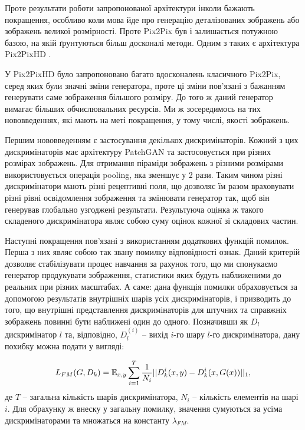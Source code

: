Проте результати роботи запропонованої архітектури інколи
бажають покращення, особливо коли мова йде про генерацію
деталізованих зображень або зображень великої розмірності.
Проте Pix2Pix був і залишається потужною базою, на якій
ґрунтуються більш досконалі методи. Одним з таких є архітектура
Pix2PixHD \cite{pix2pixHD}.

У Pix2PixHD було запропоновано багато вдосконалень класичного
Pix2Pix, серед яких були значні зміни генератора, проте
ці зміни пов'язані з бажанням генерувати саме зображення
більшого розміру. До того ж даний генератор вимагає
більших обчислювальних ресурсів. Ми ж зосередимось на
тих нововведеннях, які мають на меті покращення, у тому числі,
якості зображень.

Першим нововведенням є застосування декількох дискримінаторів.
Кожний з цих дискримінаторів має архітектуру PatchGAN та застосовується
при різних розмірах зображень. Для отримання піраміди зображень
з різними розмірами використовується операція pooling, яка зменшує
у 2 рази. Таким чином різні дискримінатори мають різні рецептивні
поля, що дозволяє їм разом враховувати різні рівні освідомлення
зображення та змінювати генератор так, щоб він генерував
глобально узгоджені результати. Результуюча оцінка ж такого
складеного дискримінатора являє собою суму оцінок кожної
зі складових частин.

Наступні покращення пов'язані з використанням додаткових
функцій помилок. Перша з них являє собою так звану помилку
відповідності ознак. Даний критерій дозволяє стабілізувати
процес навчання за рахунок того, що ми спонукаємо генератор
продукувати зображення, статистики яких будуть наближеними
до реальних при різних масштабах. А саме: дана функція помилки
обраховується за допомогою результатів внутрішніх шарів усіх
дискримінаторів, і призводить до того, що внутрішні представлення
дискримінаторів для штучних та справжніх зображень повинні бути
наближені один до одного. Позначивши як $D_l$ дискримінатор $l$ та, відповідно,
$D_l^{(i)}$ -- вихід $i$-го шару $l$-го дискримінатора, дану похибку можна
подати у вигляді:

\begin{equation} \label{eq:fm_loss}
    L_{FM}(G, D_k) = \operatorname{\mathbb{E}}_{x, y} \sum\limits_{i=1}^T
    \frac{1}{N_i} || D^i_k(x, y) - D^i_k(x, G(x)) ||_1,
\end{equation}
де $T$ -- загальна кількість шарів дискримінатора, $N_i$ -- кількість
елементів на шарі $i$. Для обрахунку ж внеску у загальну помилку,
значення сумуються за усіма дискримінаторами та множаться
на константу $\lambda_{FM}$.

